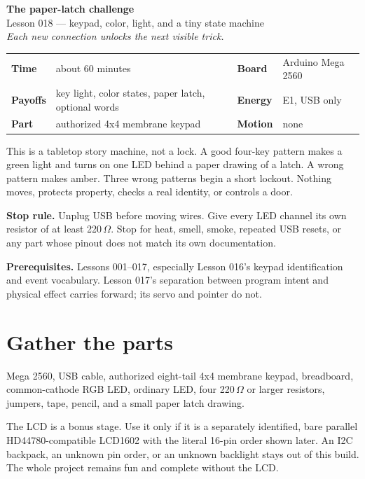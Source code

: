 \documentclass[11pt]{article}
\begin{document}
\begin{center}
{\Huge\bfseries The paper-latch challenge}\\[4pt]
{\Large Lesson 018 --- keypad, color, light, and a tiny state machine}\\[6pt]
\textit{Each new connection unlocks the next visible trick.}
\end{center}

\begin{tabularx}{\linewidth}{@{}>{\bfseries}lX>{\bfseries}lX@{}}
Time & about 60 minutes & Board & Arduino Mega 2560\\
Payoffs & key light, color states, paper latch, optional words & Energy & E1, USB only\\
Part & authorized 4x4 membrane keypad & Motion & none\\
\end{tabularx}

This is a tabletop story machine, not a lock. A good four-key pattern makes a
green light and turns on one LED behind a paper drawing of a latch. A wrong
pattern makes amber. Three wrong patterns begin a short lockout. Nothing moves,
protects property, checks a real identity, or controls a door.

\textbf{Stop rule.} Unplug USB before moving wires. Give every LED channel its
own resistor of at least 220\,\(\Omega\). Stop for heat, smell, smoke, repeated
USB resets, or any part whose pinout does not match its own documentation.

\textbf{Prerequisites.} Lessons 001--017, especially Lesson 016's keypad
identification and event vocabulary. Lesson 017's separation between program
intent and physical effect carries forward; its servo and pointer do not.

\section*{Gather the parts}

Mega 2560, USB cable, authorized eight-tail 4x4 membrane keypad, breadboard,
common-cathode RGB LED, ordinary LED, four 220\,\(\Omega\) or larger resistors,
jumpers, tape, pencil, and a small paper latch drawing.

The LCD is a bonus stage. Use it only if it is a separately identified,
bare parallel HD44780-compatible LCD1602 with the literal 16-pin order shown
later. An I2C backpack, an unknown pin order, or an unknown backlight stays out
of this build. The whole project remains fun and complete without the LCD.
\end{document}
